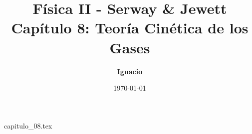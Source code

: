 \documentclass[11pt,spanish,oneside]{report}
\title{\textbf{Física II - Serway \& Jewett} \\ \Large Capítulo 8: Teoría Cinética de los Gases}
\author{\textbf{Ignacio}}
\date{\today}
\begin{document}
\maketitle

{capitulo_08.tex}
\end{document}
